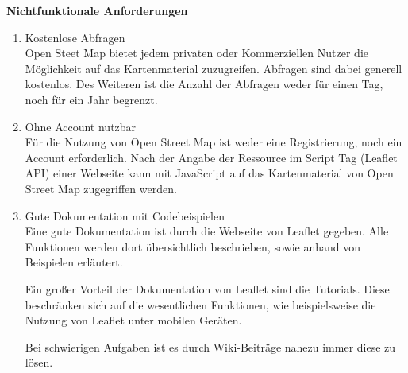 \textbf{Nichtfunktionale Anforderungen}
\begin{enumerate}
\item Kostenlose Abfragen \\
Open Steet Map bietet jedem privaten oder Kommerziellen Nutzer die Möglichkeit auf das Kartenmaterial zuzugreifen. Abfragen sind dabei generell kostenlos. Des Weiteren ist die Anzahl der Abfragen weder für einen Tag, noch für ein Jahr begrenzt. \cite{gruber2015}

\item Ohne Account nutzbar\\
Für die Nutzung von Open Street Map ist weder eine Registrierung, noch ein Account erforderlich. Nach der Angabe der Ressource im Script Tag (Leaflet API) einer Webseite kann mit JavaScript auf das Kartenmaterial von Open Street Map zugegriffen werden. 
\cite{leaflet}

\item Gute Dokumentation mit Codebeispielen\\
Eine gute Dokumentation ist durch die Webseite von Leaflet gegeben. Alle Funktionen werden dort übersichtlich beschrieben, sowie anhand von Beispielen erläutert. 

Ein großer Vorteil der Dokumentation von Leaflet sind die Tutorials. Diese beschränken sich auf die wesentlichen Funktionen, wie beispielsweise die Nutzung von Leaflet unter mobilen Geräten. 
\cite{leaflet}

Bei schwierigen Aufgaben ist es durch Wiki-Beiträge nahezu immer diese zu lösen. \cite{gruber2015}


\end{enumerate}


